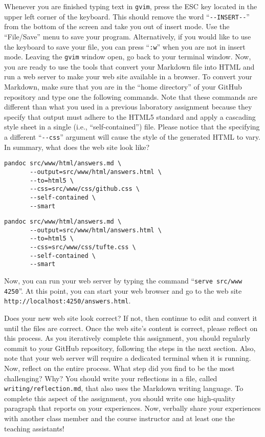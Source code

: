 \documentclass[11pt]{article}
\newcommand{\reflection}{\lstinline{writing/reflection.md}}
\newcommand{\command}[1]{``\lstinline{#1}''}
\newcommand{\program}[1]{\lstinline{#1}}
\newcommand{\url}[1]{\lstinline{#1}}
\newcommand{\option}[1]{``{#1}''}
\begin{document}
Whenever you are finished typing text in \program{gvim}, press the ESC key
located in the upper left corner of the keyboard. This should remove the word
\command{--INSERT--} from the bottom of the screen and take you out of insert
mode. Use the \option{File/Save} menu to save your program. Alternatively, if
you would like to use the keyboard to save your file, you can press \command{:w}
when you are not in insert mode. Leaving the {\tt gvim} window open, go back to
your terminal window. Now, you are ready to use the tools that convert your
Markdown file into HTML and run a web server to make your web site available in
a browser. To convert your Markdown, make sure that you are in the ``home
directory'' of your GitHub repository and type one the following commands. Note
that these commands are different than what you used in a previous laboratory
assignment because they specify that output must adhere to the HTML5 standard
and apply a cascading style sheet in a single (i.e., ``self-contained'') file.
Please notice that the specifying a different \command{--css} argument will
cause the style of the generated HTML to vary. In summary, what does the web
site look like?

\begin{verbatim}
pandoc src/www/html/answers.md \
       --output=src/www/html/answers.html \
       --to=html5 \
       --css=src/www/css/github.css \
       --self-contained \
       --smart
\end{verbatim}

\begin{verbatim}
pandoc src/www/html/answers.md \
       --output=src/www/html/answers.html \
       --to=html5 \
       --css=src/www/css/tufte.css \
       --self-contained \
       --smart
\end{verbatim}

Now, you can
run your web server by typing the command \command{serve src/www 4250}. At this point, you can start your web browser
and go to the web site \url{http://localhost:4250/answers.html}.

Does your new web site look correct? If not, then continue to edit and convert it until the files are correct. Once the
web site's content is correct, please reflect on this process. As you iteratively complete this assignment, you should
regularly commit to your GitHub repository, following the steps in the next section. Also, note that your web server
will require a dedicated terminal when it is running. Now, reflect on the entire process. What step did you find to be
the most challenging? Why? You should write your reflections in a file, called \reflection{}, that also uses the
Markdown writing language. To complete this aspect of the assignment, you should write one high-quality paragraph that
reports on your experiences. Now, verbally share your experiences with another class member and the course instructor
and at least one the teaching assistants!
\end{document}
